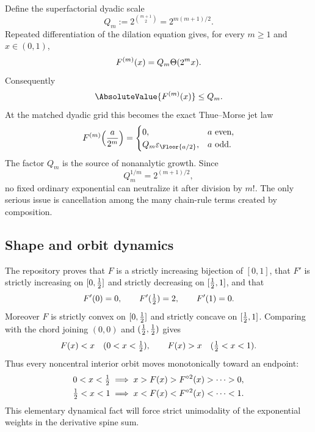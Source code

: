 Define the superfactorial dyadic scale
\begin{equation}
  Q_m:=2^{\binom{m+1}{2}}=2^{m(m+1)/2}.
  \label{ii:eq:Qm}
\end{equation}
Repeated differentiation of the dilation equation gives, for every $m\geq1$ and
$x\in(0,1)$,
\begin{equation}
  F^{(m)}(x)=Q_m\Theta(2^m x).
  \label{ii:eq:derivative-atlas}
\end{equation}
Consequently
\begin{equation}
  \AbsoluteValue{F^{(m)}(x)}\leq Q_m.
  \label{ii:eq:F-derivative-bound}
\end{equation}
At the matched dyadic grid this becomes the exact Thue--Morse jet law
\begin{equation}
 F^{(m)}\!\left(\frac{a}{2^m}\right)
 =\begin{cases}
 0,&a\text{ even},\\
 Q_m\eps_{\Floor{a/2}},&a\text{ odd}.
 \end{cases}
 \label{ii:eq:dyadic-jet}
\end{equation}
The factor $Q_m$ is the source of nonanalytic growth.  Since
\begin{equation}
  Q_m^{1/m}=2^{(m+1)/2},
  \label{ii:eq:Q-root}
\end{equation}
no fixed ordinary exponential can neutralize it after division by $m!$.
The only serious issue is cancellation among the many chain-rule terms created by
composition.

\subsection{Shape and orbit dynamics}

The repository proves that $F$ is a strictly increasing bijection of $[0,1]$, that
$F'$ is strictly increasing on $[0,\tfrac12]$ and strictly decreasing on
$[\tfrac12,1]$, and that
\begin{equation}
 F'(0)=0,\qquad F'(\tfrac12)=2,\qquad F'(1)=0.
 \label{ii:eq:slope-values}
\end{equation}
Moreover $F$ is strictly convex on $[0,\tfrac12]$ and strictly concave on
$[\tfrac12,1]$.  Comparing with the chord joining $(0,0)$ and $(\tfrac12,\tfrac12)$ gives
\begin{equation}
  F(x)<x\quad(0<x<\tfrac12),
  \qquad
  F(x)>x\quad(\tfrac12<x<1).
  \label{ii:eq:drift}
\end{equation}
Thus every noncentral interior orbit moves monotonically toward an endpoint:
\begin{align}
 0<x<\tfrac12&\implies x>F(x)>F^{\mathbin{\circ}2}(x)>\cdots>0,
 \label{ii:eq:left-orbit}\\
 \tfrac12<x<1&\implies x<F(x)<F^{\mathbin{\circ}2}(x)<\cdots<1.
 \label{ii:eq:right-orbit}
\end{align}
This elementary dynamical fact will force strict unimodality of the exponential
weights in the derivative spine sum.

